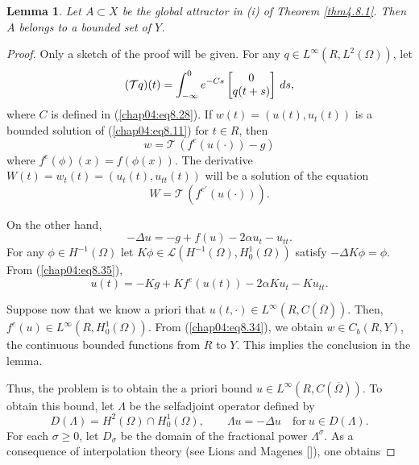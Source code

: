 \documentclass{surv-l}
\theoremstyle{plain}
\newtheorem{lemma}[theorem]{Lemma}
\theoremstyle{definition}
\numberwithin{equation}{section}
\numberwithin{figure}{chapter}
\begin{document}
\begin{lemma}\label{lem4.8.13}
Let $A\subset X$ be the global attractor in \emph{(i)} of Theorem \emph{\ref{thm4.8.1}.} Then $A$ belongs to a bounded set of $Y$.
\end{lemma}

\begin{proof}
Only a sketch of the proof will be given. For any $q\in L^{\infty}(R, L^{2}(\Omega))$, let
\begin{align}\label{chap04:eq8.33}
(\mathcal{T}q)(t)=\int_{-\infty}^{0}e^{-Cs} \left[\begin{array}{@{}c@{}}
0 \\
q(t+ s)
\end{array}\right]\, ds,
\end{align}
where $C$ is defined in (\ref{chap04:eq8.28}). If $w(t)=(u(t), u_{t}(t))$ is a bounded solution of (\ref{chap04:eq8.11}) for $t\in R$, then
\begin{equation}\label{chap04:eq8.34}
w=\mathcal{T}\, (f^{e}(u(\cdot))-g)
\end{equation}
where $f^{e}(\phi)(x)=f(\phi(x))$. The derivative $W(t)=w_{t}(t)=(u_{t}(t), u_{tt}(t))$ will be a solution of the equation
\begin{equation}\label{chap04:eq8.35}
W=\mathcal{T}\,({f}^{e\prime}(u(\cdot))).
\end{equation}

On the other hand,
\begin{equation}\label{chap04:eq8.36}
-\Delta u=-g+f(u)-2\alpha u_{t}-u_{tt}.
\end{equation}
For any $\phi\in H^{-1}(\Omega)$ let $ K\phi \in \mathcal{L}(H^{-1}(\Omega), H_{0}^{1}(\Omega))$ satisfy $-\Delta K\phi=\phi$. From (\ref{chap04:eq8.35}),
\begin{equation}\label{chap04:eq8.37}
u(t)=-Kg+Kf^{e}(u(t))-2\alpha Ku_{t}-Ku_{tt}.
\end{equation}

Suppose now that we know a priori that $u(t, \cdot)\in L^{\infty}(R, C(\overline{\Omega}))$. Then, $ f^{e}(u)\in L^{\infty}(R, H_{0}^{1}(\Omega))$. From (\ref{chap04:eq8.34}), we obtain $w\in C_{b}(R, Y)$, the continuous bounded functions from $R$ to $Y$. This implies the conclusion in the lemma.

Thus, the problem is to obtain the a priori bound $u\in L^{\infty}(R, C(\overline{\Omega}))$. To obtain this bound, let $\Lambda$ be the selfadjoint operator defined by
\begin{equation*}
D(\Lambda)=H^{2}(\Omega)\cap H_{0}^{1}(\Omega),\qquad \Lambda u=-\Delta u\quad \mathrm{for}\ u\in D(\Lambda).
\end{equation*}
For each $\sigma\geq 0$, let $D_{\sigma}$ be the domain of the fractional power $\Lambda^{\sigma}$. As a consequence of interpolation theory (see Lions and Magenes [\citeyear{1968lm}]), one obtains
\end{proof}
\end{document}
